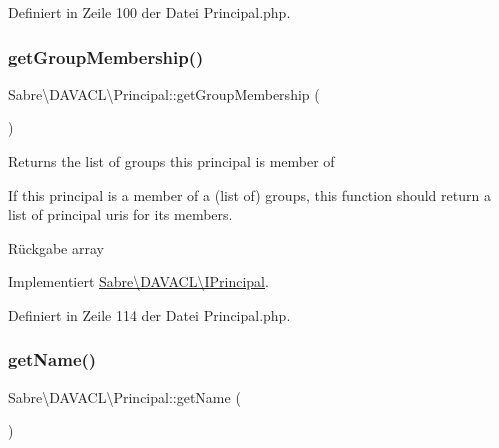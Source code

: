 Definiert in Zeile 100 der Datei Principal.\+php.

\mbox{\label{class_sabre_1_1_d_a_v_a_c_l_1_1_principal_a64163e10348143c641f84e3c13de35a6}} 
\subsubsection{\texorpdfstring{get\+Group\+Membership()}{getGroupMembership()}}
{\footnotesize\ttfamily Sabre\textbackslash{}\+D\+A\+V\+A\+C\+L\textbackslash{}\+Principal\+::get\+Group\+Membership (\begin{DoxyParamCaption}{ }\end{DoxyParamCaption})}

Returns the list of groups this principal is member of

If this principal is a member of a (list of) groups, this function should return a list of principal uri\textquotesingle{}s for it\textquotesingle{}s members.

\begin{DoxyReturn}{Rückgabe}
array 
\end{DoxyReturn}


Implementiert \mbox{\hyperlink{interface_sabre_1_1_d_a_v_a_c_l_1_1_i_principal_a8921b6c6ba5421dd0a6f6ba26def6fbd}{Sabre\textbackslash{}\+D\+A\+V\+A\+C\+L\textbackslash{}\+I\+Principal}}.



Definiert in Zeile 114 der Datei Principal.\+php.

\mbox{\label{class_sabre_1_1_d_a_v_a_c_l_1_1_principal_a87c0a0ee299336eca2d79f46662bfe84}} 
\subsubsection{\texorpdfstring{get\+Name()}{getName()}}
{\footnotesize\ttfamily Sabre\textbackslash{}\+D\+A\+V\+A\+C\+L\textbackslash{}\+Principal\+::get\+Name (\begin{DoxyParamCaption}{ }\end{DoxyParamCaption})}

